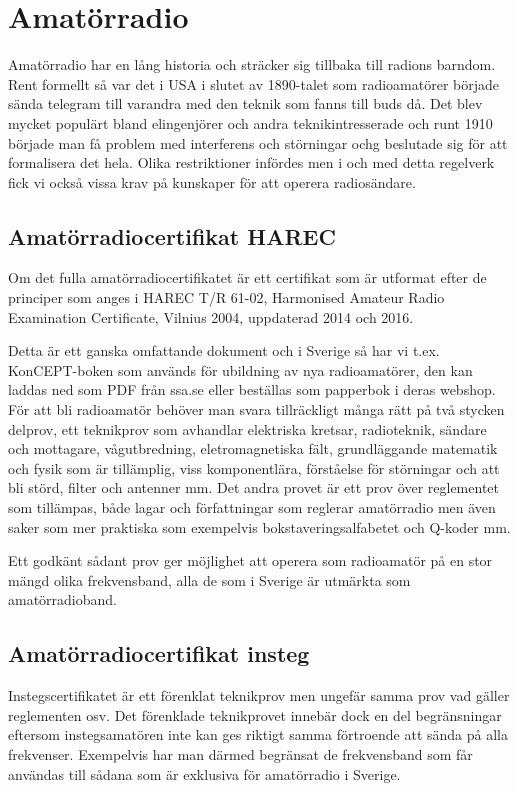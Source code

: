 \section{Amatörradio}

Amatörradio har en lång historia och sträcker sig tillbaka till radions
barndom. Rent formellt så var det i USA i slutet av 1890-talet som radioamatörer
började sända telegram till varandra med den teknik som fanns till buds då. Det
blev mycket populärt bland elingenjörer och andra teknikintresserade och runt
1910 började man få problem med interferens och störningar ochg beslutade sig
för att formalisera det hela. Olika restriktioner infördes men i och med detta
regelverk fick vi också vissa krav på kunskaper för att operera radiosändare.

\subsection{Amatörradiocertifikat HAREC}

Om det fulla amatörradiocertifikatet är ett certifikat som är utformat efter de
principer som anges i HAREC T/R 61-02, Harmonised Amateur Radio Examination
Certificate, Vilnius 2004, uppdaterad 2014 och 2016.

Detta är ett ganska omfattande dokument och i Sverige så har vi t.ex.
KonCEPT-boken som används för ubildning av nya radioamatörer, den kan laddas ned
som PDF från ssa.se eller beställas som papperbok i deras webshop. För att bli
radioamatör behöver man svara tillräckligt många rätt på två stycken delprov,
ett teknikprov som avhandlar elektriska kretsar, radioteknik, sändare och
mottagare, vågutbredning, eletromagnetiska fält, grundläggande matematik och
fysik som är tillämplig, viss komponentlära, förståelse för störningar och att
bli störd, filter och antenner mm. Det andra provet är ett prov över reglementet
som tillämpas, både lagar och författningar som reglerar amatörradio men även
saker som mer praktiska som exempelvis bokstaveringsalfabetet och Q-koder mm.

Ett godkänt sådant prov ger möjlighet att operera som radioamatör på
en stor mängd olika frekvensband, alla de som i Sverige är utmärkta
som amatörradioband.

\subsection{Amatörradiocertifikat insteg}
\label{sec:instegscertifikat}

Instegscertifikatet är ett förenklat teknikprov men ungefär samma prov vad
gäller reglementen osv. Det förenklade teknikprovet innebär dock en del
begränsningar eftersom instegsamatören inte kan ges riktigt samma förtroende att
sända på alla frekvenser. Exempelvis har man därmed begränsat de frekvensband
som får användas till sådana som är exklusiva för amatörradio i Sverige.

